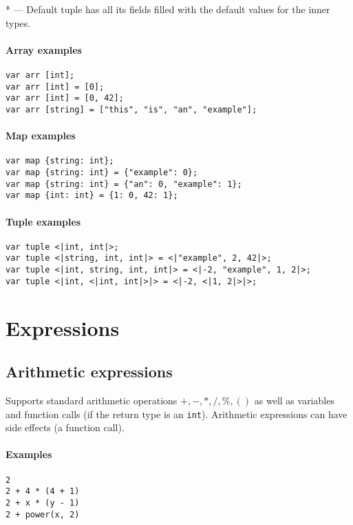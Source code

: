 \documentclass{article}
\begin{document}
* --- Default tuple has all its fields filled with the default values for the
inner types.

\paragraph{Array examples}
\texttt{var arr [int];} \\
\texttt{var arr [int] = [0];} \\
\texttt{var arr [int] = [0, 42];} \\
\texttt{var arr [string] = ["this", "is", "an", "example"];}

\paragraph{Map examples}
\texttt{var map \{string: int\}; }\\
\texttt{var map \{string: int\} = \{"example": 0\};} \\
\texttt{var map \{string: int\} = \{"an": 0, "example": 1\};} \\
\texttt{var map \{int: int\} = \{1: 0, 42: 1\};}

\paragraph{Tuple examples}
\texttt{var tuple <|int, int|>;} \\
\texttt{var tuple <|string, int, int|> = <|"example", 2, 42|>;} \\
\texttt{var tuple <|int, string, int, int|> = <|-2, "example", 1, 2|>;} \\
\texttt{var tuple <|int, <|int, int|>|> = <|-2, <|1, 2|>|>;}

\section{Expressions}

\subsection{Arithmetic expressions}
Supports standard arithmetic operations $+, -, *, /, \%, ()$ as well as
variables and function calls (if the return type is an \texttt{int}). Arithmetic
expressions can have side effects (a function call).

\paragraph{Examples}
\texttt{2} \\
\texttt{2 + 4 * (4 + 1)} \\
\texttt{2 + x * (y - 1)} \\
\texttt{2 + power(x, 2)}
\end{document}
